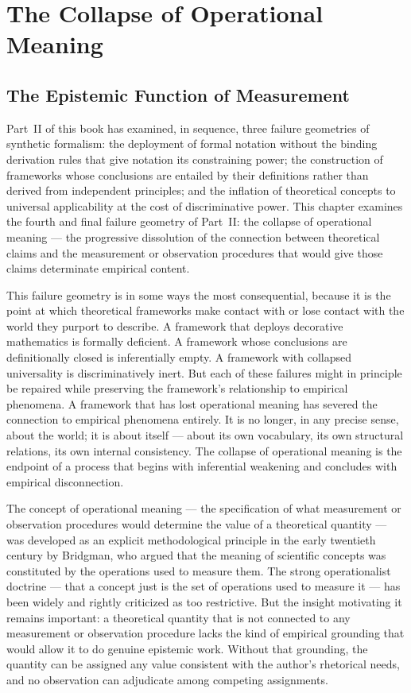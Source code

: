 \documentclass[12pt, openright, twoside]{book}
\begin{document}
\clearpage

\chapter{The Collapse of Operational Meaning}

\section{The Epistemic Function of Measurement}

Part~II of this book has examined, in sequence, three failure
geometries of synthetic formalism: the deployment of formal
notation without the binding derivation rules that give notation
its constraining power; the construction of frameworks whose
conclusions are entailed by their definitions rather than derived
from independent principles; and the inflation of theoretical
concepts to universal applicability at the cost of discriminative
power. This chapter examines the fourth and final failure geometry
of Part~II: the collapse of operational meaning --- the
progressive dissolution of the connection between theoretical
claims and the measurement or observation procedures that would
give those claims determinate empirical content.

This failure geometry is in some ways the most consequential,
because it is the point at which theoretical frameworks make
contact with or lose contact with the world they purport to
describe. A framework that deploys decorative mathematics is
formally deficient. A framework whose conclusions are definitionally
closed is inferentially empty. A framework with collapsed
universality is discriminatively inert. But each of these failures
might in principle be repaired while preserving the framework's
relationship to empirical phenomena. A framework that has lost
operational meaning has severed the connection to empirical
phenomena entirely. It is no longer, in any precise sense,
about the world; it is about itself --- about its own vocabulary,
its own structural relations, its own internal consistency.
The collapse of operational meaning is the endpoint of a process
that begins with inferential weakening and concludes with
empirical disconnection.

The concept of operational meaning --- the specification of
what measurement or observation procedures would determine
the value of a theoretical quantity --- was developed as an
explicit methodological principle in the early twentieth century
by Bridgman, who argued that the meaning of scientific concepts
was constituted by the operations used to measure them. The
strong operationalist doctrine --- that a concept just is the
set of operations used to measure it --- has been widely and
rightly criticized as too restrictive. But the insight motivating
it remains important: a theoretical quantity that is not connected
to any measurement or observation procedure lacks the kind of
empirical grounding that would allow it to do genuine epistemic
work. Without that grounding, the quantity can be assigned any
value consistent with the author's rhetorical needs, and no
observation can adjudicate among competing assignments.
\end{document}
